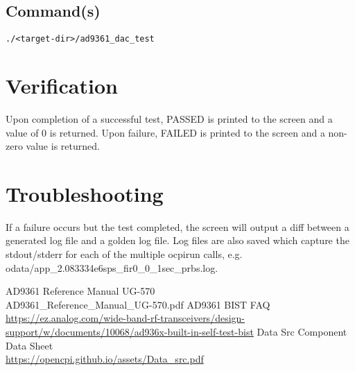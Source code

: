 \subsection{Command(s)}
\begin{lstlisting}
./<target-dir>/ad9361_dac_test
\end{lstlisting}

\section{Verification}
Upon completion of a successful test, PASSED is printed to the screen and a value of 0 is returned. Upon failure, FAILED is printed to the screen and a non-zero value is returned.

\section{Troubleshooting}
If a failure occurs but the test completed, the screen will output a diff between a generated log file and a golden log file. Log files are also saved which capture the stdout/stderr for each of the multiple ocpirun calls, e.g. odata/app\_2.083334e6sps\_fir0\_0\_1sec\_prbs.log.

\begin{thebibliography}{1}

 AD9361 Reference Manual UG-570\\
AD9361\_Reference\_Manual\_UG-570.pdf
 AD9361 BIST FAQ \\
\url{https://ez.analog.com/wide-band-rf-transceivers/design-support/w/documents/10068/ad936x-built-in-self-test-bist}
 Data Src Component Data Sheet \\
\url{https://opencpi.github.io/assets/Data_src.pdf}

\end{thebibliography}


